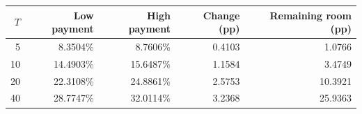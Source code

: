 \begin{tabular}{rrrrr}
\toprule
$T$ & Low payment & High payment & Change (pp) & Remaining room (pp)\\
\midrule
5 & 8.3504\% & 8.7606\% & 0.4103 & 1.0766 \\
10 & 14.4903\% & 15.6487\% & 1.1584 & 3.4749 \\
20 & 22.3108\% & 24.8861\% & 2.5753 & 10.3921 \\
40 & 28.7747\% & 32.0114\% & 3.2368 & 25.9363 \\
\bottomrule
\end{tabular}
